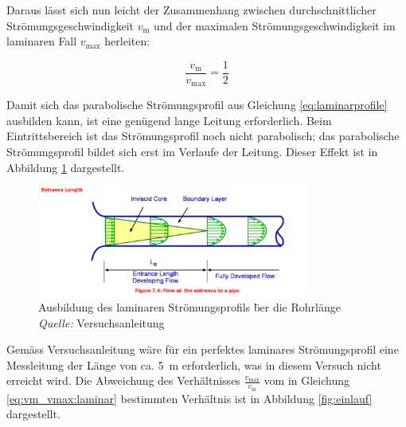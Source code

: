 Daraus    l\"asst    sich    nun     leicht    der    Zusammenhang    zwischen
durchschnittlicher   Str\"omungsgeschwindigkeit   $v_{\mathrm{m}}$   und   der
maximalen  Str\"omungsgeschwindigkeit  im  laminaren  Fall  $v_{\mathrm{max}}$
herleiten:

\begin{equation}
    \label{eq:vm_vmax:laminar}
    \frac{v_{\mathrm{m}}}{v_{\mathrm{max}}} = \frac{1}{2}
\end{equation}


Damit    sich    das     parabolische    Str\"omungsprofil    aus    Gleichung
\ref{eq:laminarprofile}   ausbilden   kann,    ist   eine   gen\"ugend   lange
Leitung   erforderlich. Beim   Eintrittsbereich  ist   das   Str\"omungsprofil
noch   nicht   parabolisch;    das   parabolische   Str\"omungsprofil   bildet
sich  erst   im  Verlaufe   der  Leitung. Dieser   Effekt  ist   in  Abbildung
\ref{fig:ausbildungLaminareStromung} dargestellt.

\vspace{1em}
\begin{figure}[h!t]
    \centering
    \includegraphics[width=0.8\textwidth]{images/ausbildung-laminares-stroemungsprofil.png}
    \caption{Ausbildung des laminaren Str\"omungsprofils \"ber die Rohrl\"ange \emph{Quelle:} Versuchsanleitung}
    \label{fig:ausbildungLaminareStromung}
\end{figure}

\clearpage
Gem\"ass    Versuchsanleitung   w\"are    f\"ur   ein    perfektes   laminares
Str\"omungsprofil   eine  Messleitung   der  L\"ange   von  ca. \SI{5}{\meter}
erforderlich,  was  in  diesem  Versuch nicht  erreicht  wird. Die  Abweichung
des   Verh\"altnisses    $\frac{v_{\mathrm{max}}}{v_{\mathrm{m}}}$   vom    in
Gleichung  \ref{eq:vm_vmax:laminar} bestimmten Verh\"altnis  ist in  Abbildung
\ref{fig:einlauf} dargestellt.

